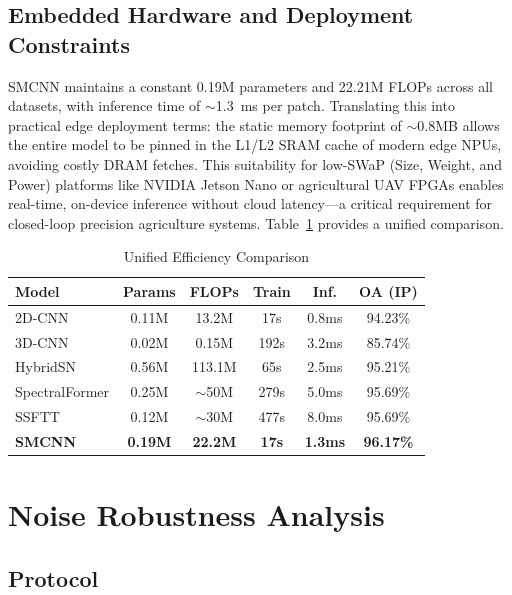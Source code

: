 \documentclass[pdflatex,sn-mathphys-num]{sn-jnl}
\theoremstyle{thmstyleone}
\theoremstyle{thmstyletwo}
\theoremstyle{thmstylethree}
\begin{document}
\subsection{Embedded Hardware and Deployment Constraints}
SMCNN maintains a constant 0.19M parameters and 22.21M FLOPs across all datasets, with inference time of $\sim$1.3~ms per patch. Translating this into practical edge deployment terms: the static memory footprint of $\sim$0.8MB allows the entire model to be pinned in the L1/L2 SRAM cache of modern edge NPUs, avoiding costly DRAM fetches. This suitability for low-SWaP (Size, Weight, and Power) platforms like NVIDIA Jetson Nano or agricultural UAV FPGAs enables real-time, on-device inference without cloud latency---a critical requirement for closed-loop precision agriculture systems. Table~\ref{tab:efficiency_unified} provides a unified comparison.

\begin{table}[!t]
\caption{Unified Efficiency Comparison}
\label{tab:efficiency_unified}
\centering

\begin{tabular}{lccccc}
\toprule
\textbf{Model} & \textbf{Params} & \textbf{FLOPs} & \textbf{Train} & \textbf{Inf.} & \textbf{OA (IP)} \\
\midrule
2D-CNN & 0.11M & 13.2M & 17s & 0.8ms & 94.23\% \\
3D-CNN & 0.02M & 0.15M & 192s & 3.2ms & 85.74\% \\
HybridSN & 0.56M & 113.1M & 65s & 2.5ms & 95.21\% \\
SpectralFormer & 0.25M & $\sim$50M & 279s & 5.0ms & 95.69\% \\
SSFTT & 0.12M & $\sim$30M & 477s & 8.0ms & 95.69\% \\
\textbf{SMCNN} & \textbf{0.19M} & \textbf{22.2M} & \textbf{17s} & \textbf{1.3ms} & \textbf{96.17\%} \\
\bottomrule
\end{tabular}
\end{table}


\section{Noise Robustness Analysis}

\subsection{Protocol}
\end{document}
